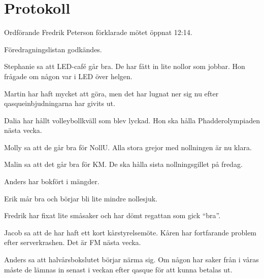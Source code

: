 \documentclass[10pt]{article}
\def\mo{Fredrik Peterson}
\begin{document}
\section*{Protokoll}
\begin{paragrafer}
Ordförande {\mo} förklarade mötet öppnat 12:14.

\valavmo

\valavms

\tosg

\ingaadj

\valavj

Föredragningslistan godkändes.


\begin{fyllnadsval} %
\end{fyllnadsval}

\begin{paragrafer}
Stephanie sa att LED-café går bra. De har fått in lite nollor som jobbar. Hon frågade om någon var i LED över helgen.

Martin har haft mycket att göra, men det har lugnat ner sig nu efter qasqueinbjudningarna har givits ut.

Dalia har hållt volleybollkväll som blev lyckad. Hon ska hålla Phadderolympiaden nästa vecka.

Molly sa att de går bra för NollU. Alla stora grejor med nollningen är nu klara.

Malin sa att det går bra för KM. De ska hålla sista nollningsgillet på fredag.

Anders har bokfört i mängder.

Erik mår bra och börjar bli lite mindre nollesjuk.

Fredrik har fixat lite småsaker och har dömt regattan som gick ``bra''.

Jacob sa att de har haft ett kort kårstyrelsemöte. Kåren har fortfarande problem efter serverkrashen. Det är FM nästa vecka.

Anders sa att halvårsbokslutet börjar närma sig. Om någon har saker från i våras måste de lämnas in senast i veckan efter qasque för att kunna betalas ut.


\end{paragrafer}
\end{paragrafer}
\end{document}
